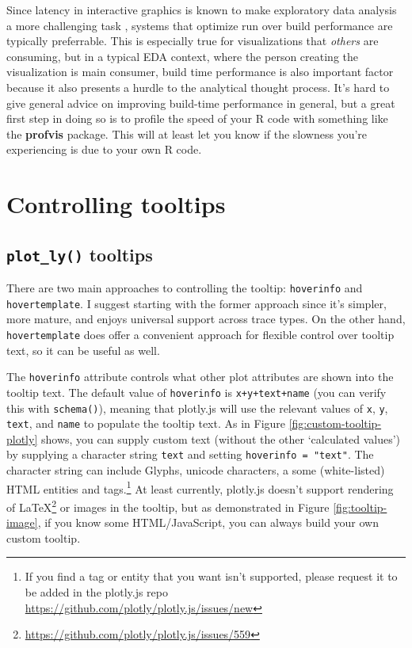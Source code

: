 \documentclass[
  12pt,
]{krantz}
\renewcommand{\href}[2]{#2\footnote{\url{#1}}}
\begin{document}
Since latency in interactive graphics is known to make exploratory data analysis a more challenging task \citep{2014-latency}, systems that optimize run over build performance are typically preferrable. This is especially true for visualizations that \emph{others} are consuming, but in a typical EDA context, where the person creating the visualization is main consumer, build time performance is also important factor because it also presents a hurdle to the analytical thought process. It's hard to give general advice on improving build-time performance in general, but a great first step in doing so is to profile the speed of your R code with something like the \textbf{profvis} package. This will at least let you know if the slowness you're experiencing is due to your own R code.

\hypertarget{controlling-tooltips}{%
\chapter{Controlling tooltips}\label{controlling-tooltips}}

\hypertarget{tooltip-text}{%
\section{\texorpdfstring{\texttt{plot\_ly()} tooltips}{plot\_ly() tooltips}}\label{tooltip-text}}

There are two main approaches to controlling the tooltip: \texttt{hoverinfo} and \texttt{hovertemplate}. I suggest starting with the former approach since it's simpler, more mature, and enjoys universal support across trace types. On the other hand, \texttt{hovertemplate} does offer a convenient approach for flexible control over tooltip text, so it can be useful as well.

The \texttt{hoverinfo} attribute controls what other plot attributes are shown into the tooltip text. The default value of \texttt{hoverinfo} is \texttt{x+y+text+name} (you can verify this with \texttt{schema()}), meaning that plotly.js will use the relevant values of \texttt{x}, \texttt{y}, \texttt{text}, and \texttt{name} to populate the tooltip text. As in Figure \ref{fig:custom-tooltip-plotly} shows, you can supply custom text (without the other `calculated values') by supplying a character string \texttt{text} and setting \texttt{hoverinfo\ =\ "text"}. The character string can include Glyphs, unicode characters, a some (white-listed) HTML entities and tags.\footnote{If you find a tag or entity that you want isn't supported, please request it to be added in the plotly.js repo \url{https://github.com/plotly/plotly.js/issues/new}} At least currently, plotly.js doesn't support rendering of \href{https://github.com/plotly/plotly.js/issues/559}{LaTeX} or images in the tooltip, but as demonstrated in Figure \ref{fig:tooltip-image}, if you know some HTML/JavaScript, you can always build your own custom tooltip.
\end{document}
